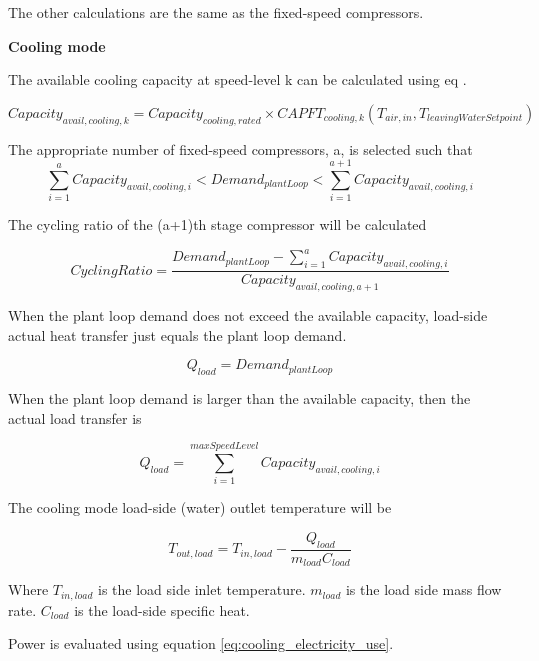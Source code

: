 The other calculations are the same as the fixed-speed compressors.

\noindent\textbf{Cooling mode}

The available cooling capacity at speed-level k can be calculated using eq .

\begin{equation}
Capacity_{avail,cooling,k} = Capacity_{cooling,rated} \times CAPFT_{cooling,k}(T_{air,in},T_{leavingWaterSetpoint}) 
\end{equation}

The appropriate number of fixed-speed compressors, a, is selected such that
\begin{equation}
\sum_{i=1}^{a} Capacity_{avail,cooling,i} < Demand_{plantLoop} < \sum_{i=1}^{a+1} Capacity_{avail,cooling,i} 
\end{equation}

The cycling ratio of the (a+1)th stage compressor will be calculated

\begin{equation}
CyclingRatio = \frac{Demand_{plantLoop} - \sum_{i=1}^{a} Capacity_{avail,cooling,i}}{Capacity_{avail,cooling,a+1}} 
\end{equation}

When the plant loop demand does not exceed the available capacity, load-side
actual heat transfer just equals the plant loop demand.

\begin{equation}
Q_{load} = Demand_{plantLoop} 
\end{equation}

When the plant loop demand is larger than the available capacity, then the actual load transfer is

\begin{equation}
Q_{load} = \sum_{i=1}^{maxSpeedLevel} Capacity_{avail,cooling,i} 
\end{equation}

The cooling mode load-side (water) outlet temperature will be 

\begin{equation}
T_{out,load} = T_{in,load} - \frac{Q_{load}}{m_{load}C_{load}} 
\end{equation}

Where $T_{in,load}$ is the load side inlet temperature. $m_{load}$ is the load side mass
flow rate. $C_{load}$ is the load-side specific heat.

Power is evaluated using equation \ref{eq:cooling_electricity_use}. 

